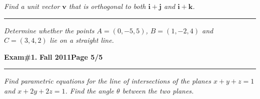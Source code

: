 \documentclass[12pt]{article}
\begin{document}
\bigskip
{\problem[15 pts] \em Find a unit vector $\boldsymbol{v}$ that is orthogonal
to both $\boldsymbol{i} + \boldsymbol{j}$ and $\boldsymbol{i} +
\boldsymbol{k}$.} 
\vspace{11cm}
\begin{flushright}
\end{flushright}
\hrule
{\problem[10 pts] \em Determine whether the points $A=(0,-5,5)$, $ B=
(1,-2,4)$ and $C=(3,4,2)$ lie on a straight line.}
\newpage

\hfill{\large\bf Exam\#1.}\hfill{\large\bf
  Fall 2011}\hfill{\large\bf Page 5/5}\hrule

\bigskip
{\problem[20 pts] \em Find parametric equations for the line of intersections
of the planes $x+y+z=1$ and $x+2y+2z=1$.  Find the angle $\theta$ between the
two planes.}
\vspace{18.5cm}
\begin{flushright}
\end{flushright}
\end{document}
